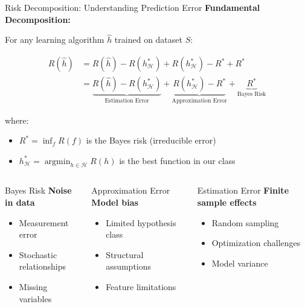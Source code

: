 \documentclass[aspectratio=169,11pt]{beamer}
\newcommand{\argmin}{\operatorname*{argmin}}
\begin{document}
\begin{frame}{Risk Decomposition: Understanding Prediction Error}
\textbf{Fundamental Decomposition:}

For any learning algorithm $\hat{h}$ trained on dataset $S$:

\begin{align}
R(\hat{h}) &= R(\hat{h}) - R(h^*_{\mathcal{H}}) + R(h^*_{\mathcal{H}}) - R^* + R^*\\
&= \underbrace{R(\hat{h}) - R(h^*_{\mathcal{H}})}_{\text{Estimation Error}} + \underbrace{R(h^*_{\mathcal{H}}) - R^*}_{\text{Approximation Error}} + \underbrace{R^*}_{\text{Bayes Risk}}
\end{align}

where:
\begin{itemize}
\item $R^* = \inf_{f} R(f)$ is the Bayes risk (irreducible error)
\item $h^*_{\mathcal{H}} = \argmin_{h \in \mathcal{H}} R(h)$ is the best function in our class
\end{itemize}

\begin{columns}
\begin{column}[t]{0.33\textwidth}
\begin{block}{Bayes Risk}
\textbf{Noise in data}
\begin{itemize}
\item Measurement error
\item Stochastic relationships
\item Missing variables
\end{itemize}
\end{block}
\end{column}
\begin{column}[t]{0.33\textwidth}
\begin{block}{Approximation Error}
\textbf{Model bias}
\begin{itemize}
\item Limited hypothesis class
\item Structural assumptions
\item Feature limitations
\end{itemize}
\end{block}
\end{column}
\begin{column}[t]{0.33\textwidth}
\begin{block}{Estimation Error}
\textbf{Finite sample effects}
\begin{itemize}
\item Random sampling
\item Optimization challenges
\item Model variance
\end{itemize}
\end{block}
\end{column}
\end{columns}
\end{frame}
\end{document}
